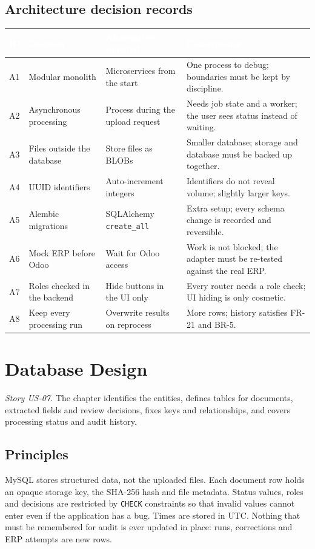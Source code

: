 \documentclass[11pt,a4paper]{report}
\newcommand{\hdr}[1]{\textcolor{white}{\sffamily\bfseries #1}}
\newcommand{\tblstart}{\rowcolors{2}{white}{rowgray}\arrayrulecolor{teal!60}}
\newcommand{\hdrrow}{\rowcolor{navy}}
\begin{document}
\section{Architecture decision records}
{\tblstart\small
\begin{longtable}{L{0.9cm}L{3.3cm}L{4.0cm}L{5.6cm}}
\hdrrow \hdr{ID} & \hdr{Decision} & \hdr{Alternative rejected} & \hdr{Consequence}\\ \endhead
A1 & Modular monolith & Microservices from the start & One process to debug; boundaries must be kept by discipline.\\
A2 & Asynchronous processing & Process during the upload request & Needs job state and a worker; the user sees status instead of waiting.\\
A3 & Files outside the database & Store files as BLOBs & Smaller database; storage and database must be backed up together.\\
A4 & UUID identifiers & Auto-increment integers & Identifiers do not reveal volume; slightly larger keys.\\
A5 & Alembic migrations & SQLAlchemy \texttt{create\_all} & Extra setup; every schema change is recorded and reversible.\\
A6 & Mock ERP before Odoo & Wait for Odoo access & Work is not blocked; the adapter must be re-tested against the real ERP.\\
A7 & Roles checked in the backend & Hide buttons in the UI only & Every router needs a role check; UI hiding is only cosmetic.\\
A8 & Keep every processing run & Overwrite results on reprocess & More rows; history satisfies FR-21 and BR-5.\\
\hline
\end{longtable}}

\chapter{Database Design}\label{ch:p2db}
\emph{Story US-07.} The chapter identifies the entities, defines tables for documents, extracted fields and review decisions, fixes keys and relationships, and covers processing status and audit history.

\section{Principles}
MySQL stores structured data, not the uploaded files. Each document row holds an opaque storage key, the SHA-256 hash and file metadata. Status values, roles and decisions are restricted by \texttt{CHECK} constraints so that invalid values cannot enter even if the application has a bug. Times are stored in UTC. Nothing that must be remembered for audit is ever updated in place: runs, corrections and ERP attempts are new rows.
\end{document}
